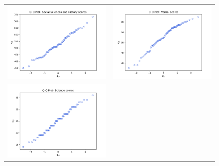 \begin{enumerate}[label= (\alph*)]
    \begin{figure}[H]
        \centering
        \begin{tabular}{cc}
            \includegraphics[scale=0.35]{./python/chapter-5/Question-5-18-c-QQ-SocSciHist.png} &
            \includegraphics[scale=0.35]{./python/chapter-5/Question-5-18-c-QQ-Verbal.png} \\
            \includegraphics[scale=0.35]{./python/chapter-5/Question-5-18-c-QQ-Science.png}

\end{tabular}
\end{figure}
\end{enumerate}
